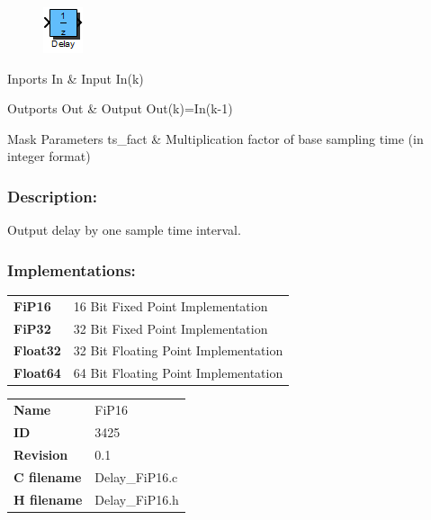 \label{block:Delay}
\begin{figure}[H]\includegraphics{Delay}\end{figure} 

\begin{XtoCtabular}{Inports}
In & Input In(k)\tabularnewline
\hline
\end{XtoCtabular}


\begin{XtoCtabular}{Outports}
Out & Output Out(k)=In(k-1)\tabularnewline
\hline
\end{XtoCtabular}

\begin{XtoCtabular}{Mask Parameters}
ts\_fact & Multiplication factor of base sampling time (in integer format)\tabularnewline
\hline
\end{XtoCtabular}

\subsubsection*{Description:}
Output delay by one sample time interval.


\subsubsection*{Implementations:}
\begin{tabular}{l l}
\textbf{FiP16} & 16 Bit Fixed Point Implementation\tabularnewline
\textbf{FiP32} & 32 Bit Fixed Point Implementation\tabularnewline
\textbf{Float32} & 32 Bit Floating Point Implementation\tabularnewline
\textbf{Float64} & 64 Bit Floating Point Implementation\tabularnewline
\end{tabular}

\nopagebreak[0]
\begin{tabular}{l l}
\textbf{Name} & FiP16 \tabularnewline
\textbf{ID} & 3425 \tabularnewline
\textbf{Revision} & 0.1 \tabularnewline
\textbf{C filename} & Delay\_FiP16.c \tabularnewline
\textbf{H filename} & Delay\_FiP16.h \tabularnewline
\end{tabular}
\vspace{1ex}

